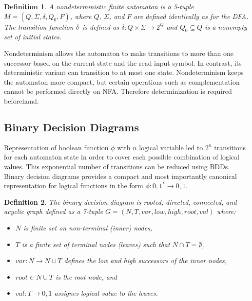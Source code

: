 \documentclass[pdflatex,sn-mathphys-num]{sn-jnl}%
\theoremstyle{thmstyleone}%
\theoremstyle{thmstyletwo}%
\theoremstyle{thmstylethree}%
\newtheorem{definition}{Definition}%
\begin{document}
        \begin{definition}
            A nondeterministic finite automaton is a 5-tuple $M = (Q, \Sigma, \delta, Q_0, F)$, where $Q$, $\Sigma$, and $F$ are defined identically as for the DFA. The transition function $\delta$~is defined as $\delta : Q \times \Sigma \rightarrow 2^{Q}$ and $Q_0 \subseteq Q$ is a nonempty set of initial states.
        \end{definition}

        Nondeterminism allows the automaton to make transitions to more than one successor based on the current state and the read input symbol. In contrast, its deterministic variant can transition to at most one state. Nondeterminism keeps the automaton more compact, but certain operations such as complementation cannot be performed directly on NFA. Therefore determinization is required beforehand.

    \subsection{Binary Decision Diagrams}
        Representation of boolean function $\phi$ with $n$ logical variable led to $2^n$ transitions for each automaton state in order to cover each possible combination of logical values. This exponential number of transitions can be reduced using BDDs.
        Binary decision diagrams provides a compact and most importantly canonical representation for logical functions in the form $\phi : {0, 1}^* \rightarrow {0, 1}$.

        \vspace*{0.5em}

        \begin{definition}
            The binary decision diagram \cite{BDD} is rooted, directed, connected, and acyclic graph defined as a 7-tuple $G = (N, T, var, low, high, root, val)$ where:
            \begin{itemize}[noindent]
                \item $N$ is finite set on non-terminal (inner) nodes,
                \item $T$ is a finite set of terminal nodes (leaves) such that $N \cap T = \emptyset$,
                \item $var : N \rightarrow N \cup T$ defines the low and high successors of the inner nodes,
                \item $root \in N \cup T$ is the root node, and
                \item $val : T \rightarrow {0, 1}$ assignes logical value to the leaves.
            \end{itemize}
        \end{definition}
\end{document}
